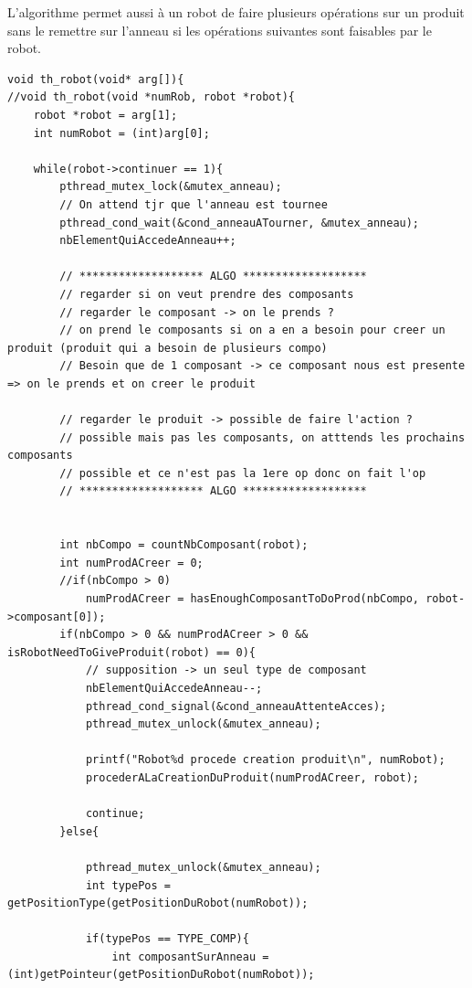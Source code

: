 \documentclass{report}
\begin{document}
L'algorithme permet aussi à un robot de faire plusieurs opérations sur un produit sans le remettre sur l'anneau si les opérations suivantes sont faisables par le robot.
\begin{lstlisting}[caption=Fonction thread des robots]
void th_robot(void* arg[]){
//void th_robot(void *numRob, robot *robot){
    robot *robot = arg[1];
    int numRobot = (int)arg[0];
    
    while(robot->continuer == 1){
        pthread_mutex_lock(&mutex_anneau);
        // On attend tjr que l'anneau est tournee
        pthread_cond_wait(&cond_anneauATourner, &mutex_anneau);
        nbElementQuiAccedeAnneau++;
        
        // ******************* ALGO *******************
        // regarder si on veut prendre des composants
        // regarder le composant -> on le prends ?
        // on prend le composants si on a en a besoin pour creer un produit (produit qui a besoin de plusieurs compo)
        // Besoin que de 1 composant -> ce composant nous est presente => on le prends et on creer le produit
        
        // regarder le produit -> possible de faire l'action ?
        // possible mais pas les composants, on atttends les prochains composants
        // possible et ce n'est pas la 1ere op donc on fait l'op
        // ******************* ALGO *******************
        
        
        int nbCompo = countNbComposant(robot);
        int numProdACreer = 0;
        //if(nbCompo > 0)
            numProdACreer = hasEnoughComposantToDoProd(nbCompo, robot->composant[0]);
        if(nbCompo > 0 && numProdACreer > 0 && isRobotNeedToGiveProduit(robot) == 0){
            // supposition -> un seul type de composant
            nbElementQuiAccedeAnneau--;
            pthread_cond_signal(&cond_anneauAttenteAcces);
            pthread_mutex_unlock(&mutex_anneau);
            
            printf("Robot%d procede creation produit\n", numRobot);
            procederALaCreationDuProduit(numProdACreer, robot);
            
            continue;
        }else{
        
            pthread_mutex_unlock(&mutex_anneau);
            int typePos = getPositionType(getPositionDuRobot(numRobot));
            
            if(typePos == TYPE_COMP){
                int composantSurAnneau = (int)getPointeur(getPositionDuRobot(numRobot));
                

\end{lstlisting}
\end{document}
